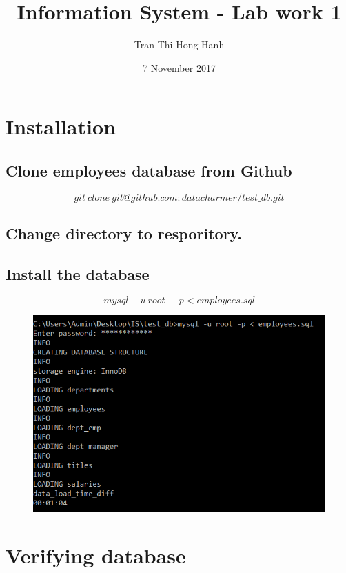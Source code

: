 \documentclass{article}
\title{Information System - Lab work 1}
\author{Tran Thi Hong Hanh}
\date{7 November 2017}
\begin{document}
\maketitle

\section{Installation}
\subsection{Clone employees database from Github}
\begin{equation}
git\ clone\ git@github.com:datacharmer/test\_db.git
\end{equation}
\subsection{Change directory to resporitory.}
\subsection{Install the database}
\begin{equation}
mysql -u\ root\ -p < employees.sql
\end{equation}
\begin{figure}[h]
\centering
\includegraphics[scale=0.7]{install.PNG}
\end{figure}

\section{Verifying database}
\end{document}
